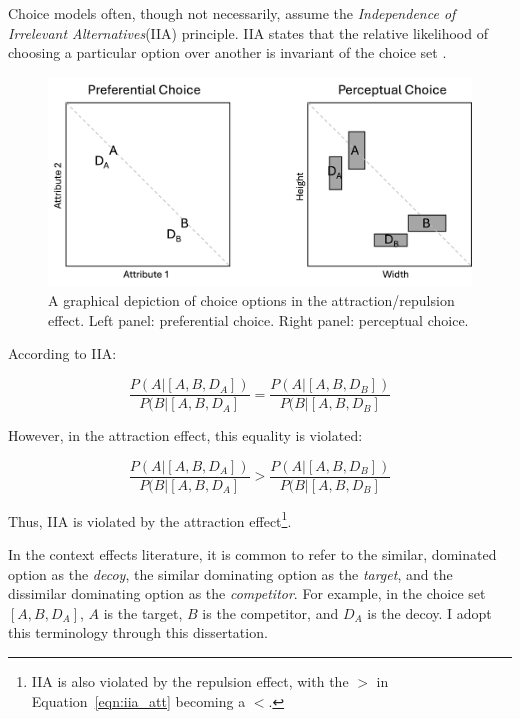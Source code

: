 Choice models often, though not necessarily, assume the \textit{Independence of Irrelevant Alternatives}(IIA) principle. IIA states that the relative likelihood of choosing a particular option over another is invariant of the choice set \parencite{ray1973independence}. 

\begin{figure}
   \includegraphics[width=\linewidth]{figures/pref_v_percep.jpg}
   \caption{A graphical depiction of choice options in the attraction/repulsion effect. Left panel: preferential choice. Right panel: perceptual choice.}
   \label{fig:fig_opts}
\end{figure}

According to IIA:

\begin{equation}
  \frac{P(A|[A,B,D_{A}])}{P(B|[A,B,D_{A}]}=\frac{P(A|[A,B,D_{B}])}{P(B|[A,B,D_{B}]}
  \label{eqn:iia}
\end{equation}

However, in the attraction effect, this equality is violated:

\begin{equation}
  \frac{P(A|[A,B,D_{A}])}{P(B|[A,B,D_{A}]}>\frac{P(A|[A,B,D_{B}])}{P(B|[A,B,D_{B}]}
  \label{eqn:iia_att}
\end{equation}

Thus, IIA is violated by the attraction effect\footnote{IIA is also violated by the repulsion effect, with the $>$ in Equation~\ref{eqn:iia_att} becoming a $<$.}.

In the context effects literature, it is common to refer to the similar, dominated option as the \textit{decoy}, the similar dominating option as the \textit{target}, and the dissimilar dominating option as the \textit{competitor}. For example, in the choice set $[A,B,D_{A}]$, $A$ is the target, $B$ is the competitor, and $D_{A}$ is the decoy. I adopt this terminology through this dissertation. 


